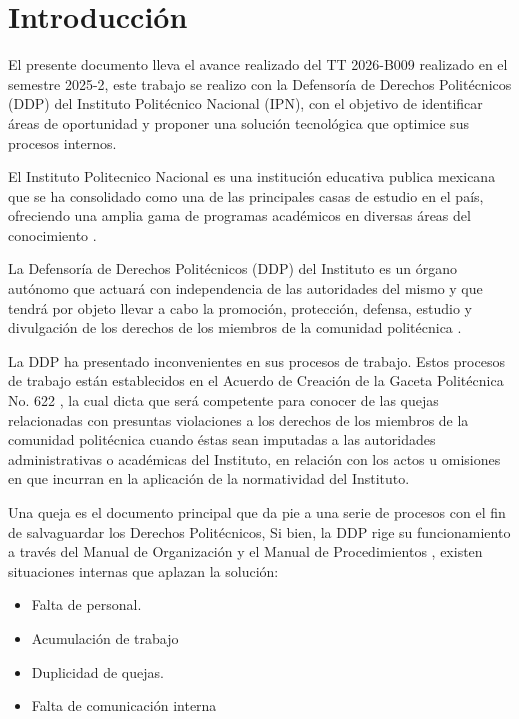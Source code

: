 
\chapter{Introducción}
\begin{flushleft}
\justifying
El presente documento lleva el avance realizado del TT 2026-B009 realizado en el semestre 2025-2, este trabajo se realizo con la Defensoría de Derechos Politécnicos (DDP) del Instituto Politécnico Nacional (IPN), con el objetivo de identificar áreas de oportunidad y proponer una solución tecnológica que optimice sus procesos internos.

El Instituto Politecnico Nacional es una institución educativa publica mexicana que se ha consolidado como una de las principales casas de estudio en el país, ofreciendo una amplia gama de programas académicos en diversas áreas del conocimiento \cite{1}.

La Defensoría de Derechos Politécnicos (DDP) del Instituto es un órgano autónomo que actuará con independencia de las autoridades del mismo y que tendrá por objeto llevar a cabo la promoción, protección, defensa, estudio y divulgación de los derechos de los miembros de la comunidad politécnica \cite{3}.

La DDP ha presentado inconvenientes en sus procesos de trabajo. Estos procesos de trabajo están establecidos en el Acuerdo de Creación de la Gaceta Politécnica No. 622 \cite{3}, la cual dicta que será competente para conocer de las quejas relacionadas con presuntas violaciones a los derechos de los miembros de la comunidad politécnica cuando éstas sean imputadas a las autoridades administrativas o académicas del Instituto, en relación con los actos u omisiones en que incurran en la aplicación de la normatividad del Instituto.

Una queja es el documento principal que da pie a una serie de procesos con el fin de salvaguardar los Derechos Politécnicos, Si bien, la DDP rige su funcionamiento a través del Manual de Organización \cite{4} y el Manual de Procedimientos \cite{5}, existen situaciones internas que aplazan la solución:
\begin{itemize}
\item Falta de personal.
\item Acumulación de trabajo
\item Duplicidad de quejas.
\item Falta de comunicación interna 
\end{itemize}


\end{flushleft}
